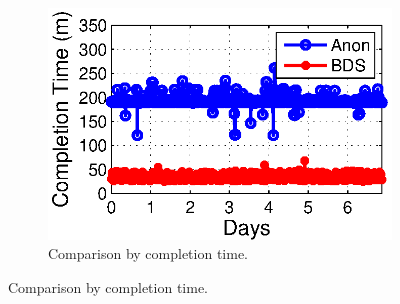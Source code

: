 \begin{figure}[t]
\begin{subfigure}[b]{0.3\textwidth}
                \includegraphics[width=\textwidth]{images/BDSvsAnon_time.eps}
                \caption{Comparison by completion time.}
                \label{fig:BDSvsAnon:time}
        \end{subfigure}
        \label{fig:BDSvsAnon}
\vspace{-0.4cm}
\end{figure}


